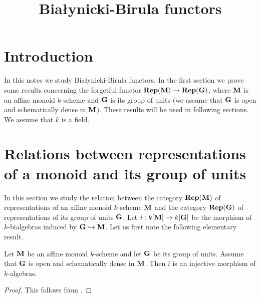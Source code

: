 



\title{Bia{\l}ynicki-Birula functors}
\date{}
\maketitle

\section{Introduction}
\noindent
In this notes we study Bia{\l}ynicki-Birula functors. In the first section we prove some results concerning the forgetful functor $\mathbf{Rep}(\mathbf{M})\rightarrow \mathbf{Rep}(\mathbf{G})$, where $\mathbf{M}$ is an affine monoid $k$-scheme and $\mathbf{G}$ is its group of units (we assume that $\mathbf{G}$ is open and schematically dense in $\mathbf{M}$). These results will be used in following sections.\\
We assume that $k$ is a field.

\section{Relations between representations of a monoid and its group of units}
\noindent
In this section we study the relation between the category $\mathbf{Rep}(\mathbf{M})$ of representations of an affine monoid $k$-scheme $\mathbf{M}$ and the category $\mathbf{Rep}(\mathbf{G})$ of representations of its group of units $\mathbf{G}$. Let $i:k[\mathbf{M}]\rightarrow k[\mathbf{G}]$ be the morphism of $k$-bialgebras induced by $\mathbf{G}\hookrightarrow \mathbf{M}$. Let us first note the following elementary result.

\begin{fact}\label{fact:monoid_bialgebra_injects_into_group_bialgebra_if_units_are_open_and_schematically_dense}
Let $\mathbf{M}$ be an affine monoid $k$-scheme and let $\mathbf{G}$ be its group of units. Assume that $\mathbf{G}$ is open and schematically dense in $\mathbf{M}$. Then $i$ is an injective morphism of $k$-algebras.
\end{fact}
\begin{proof}
This follows from {\cite[Proposition 9.19]{gortz2010algebraic}}.
\end{proof}

